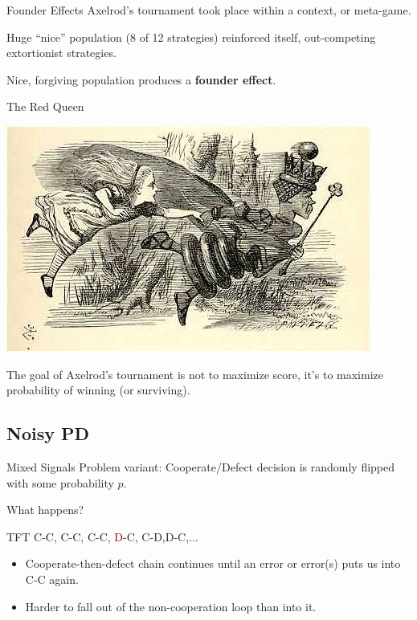 \documentclass[pdf]{beamer}
\begin{document}
\begin{frame}{Founder Effects}
  Axelrod's tournament took place within a context, or meta-game.\pause\newline

  Huge ``nice'' population (8 of 12 strategies) reinforced itself, out-competing
  extortionist strategies. \pause\newline

  Nice, forgiving population produces a \textbf{founder effect}.
\end{frame}

\begin{frame}{The Red Queen}
  \begin{center}
    \includegraphics[scale=0.25]{red_queen.jpg}
  \end{center}
  
  The goal of Axelrod's tournament is not to maximize score, it's to maximize
  probability of winning (or surviving). 
\end{frame}

\subsection{Noisy PD}
\begin{frame}{Mixed Signals}
  Problem variant: Cooperate/Defect decision is randomly flipped with some probability $p$.\newline

  What happens?
\end{frame}
\begin{frame}{TFT}
  C-C\pause, C-C\pause, C-C\pause, \textcolor{darkred}{D}-C\pause, C-D\pause,D-C\pause,$\ldots$\pause

  \begin{itemize}
  \item Cooperate-then-defect chain continues until an error or error(s) puts us into C-C again.
    \pause
  \item Harder to fall out of the non-cooperation loop than into it.
  \end{itemize}
\end{frame}
\end{document}
